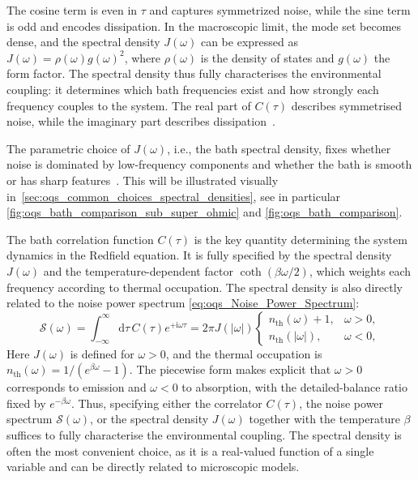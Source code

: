 The cosine term is even in $\tau$ and captures symmetrized noise, while the sine term is odd and encodes dissipation.
In the macroscopic limit, the mode set becomes dense, and the spectral density $J(\omega)$ can be expressed as $J(\omega)=\rho(\omega) g(\omega)^2$, where $\rho(\omega)$ is the density of states and $g(\omega)$ the form factor. The spectral density thus fully characterises the environmental coupling: it determines which bath frequencies exist and how strongly each frequency couples to the system. The real part of $C(\tau)$ describes symmetrised noise, while the imaginary part describes dissipation~\cite{breuerpetruccione2007theoryopenquantum,weiss2012quantumdissipativesystems,leggettetal1987dynamicsdissipativetwostate}.

\medskip
The parametric choice of $J(\omega)$, i.e., the bath spectral density, fixes whether noise is dominated by low-frequency components and whether the bath is smooth or has sharp features~\cite{breuerpetruccione2007theoryopenquantum, weiss2012quantumdissipativesystems}. This will be illustrated visually in~\autoref{sec:oqs_common_choices_spectral_densities}, see in particular \autoref{fig:oqs_bath_comparison_sub_super_ohmic} and \autoref{fig:oqs_bath_comparison}.

The bath correlation function $C(\tau)$ is the key quantity determining the system dynamics in the Redfield equation. It is fully specified by the spectral density $J(\omega)$ and the temperature-dependent factor $\coth(\beta \omega / 2)$, which weights each frequency according to thermal occupation. The spectral density is also directly related to the noise power spectrum \autoref{eq:oqs_Noise_Power_Spectrum}:
\begin{equation} \label{eq:oqs_ho_correlator_final}
	\mathcal{S}(\omega) = \int_{-\infty}^{\infty}\!\mathrm{d}\tau \, C(\tau) e^{+\mathrm{i} \omega \tau} = 2\pi J(|\omega|) \begin{cases} n_{\mathrm{th}}(\omega)+1, & \omega>0, \\ n_{\mathrm{th}}(|\omega|), & \omega<0, \end{cases}
\end{equation}
Here $J(\omega)$ is defined for $\omega>0$, and the thermal occupation is $n_{\mathrm{th}}(\omega)=1/(e^{\beta \omega}-1)$. The piecewise form makes explicit that $\omega>0$ corresponds to emission and $\omega<0$ to absorption, with the detailed-balance ratio fixed by $e^{-\beta\omega}$.
Thus, specifying either the correlator $C(\tau)$, the noise power spectrum $\mathcal{S}(\omega)$, or the spectral density $J(\omega)$ together with the temperature $\beta$ suffices to fully characterise the environmental coupling. The spectral density is often the most convenient choice, as it is a real-valued function of a single variable and can be directly related to microscopic models.

